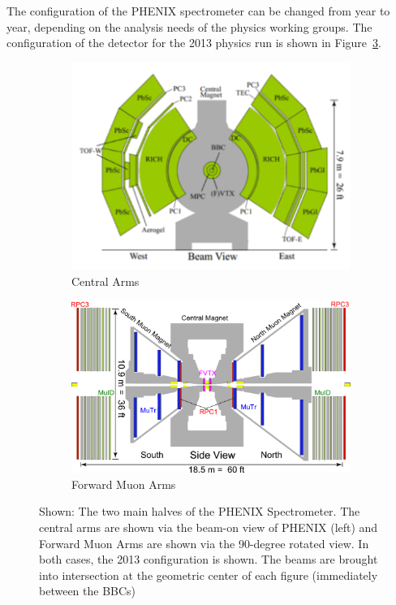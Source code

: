The configuration of the PHENIX spectrometer can be changed from year to year,
depending on the analysis needs of the physics working groups. The configuration
of the detector for the 2013 physics run is shown in
Figure~\ref{fig:phenix_2013_config}.

\begin{figure}
  \centering
  \begin{subfigure}[t]{\textwidth}
    \centering
    \includegraphics[width=0.8\linewidth]{./figures/phenix_2013_config_central_arms}
    \caption{Central Arms}
    \label{fig:phenix_central} 
  \end{subfigure} 
  \begin{subfigure}[t]{\textwidth}
    \centering
    \includegraphics[width=0.8\linewidth]{./figures/phenix_2013_config_muon_arms}
    \caption{Forward Muon Arms}
    \label{fig:phenix_forward}
  \end{subfigure}
  \caption{
    Shown: The two main halves of the PHENIX Spectrometer. The central arms are
    shown via the beam-on view of PHENIX (left) and Forward Muon Arms are shown
    via the 90-degree rotated view. In both cases, the 2013 configuration is
    shown. The beams are brought into intersection at the geometric center of
    each figure (immediately between the BBCs)
  }
  \label{fig:phenix_2013_config}
\end{figure}

